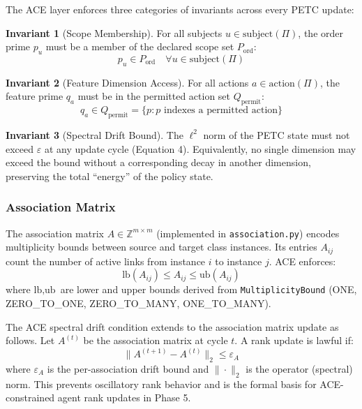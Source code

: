 \documentclass[12pt,letterpaper]{article}
\theoremstyle{definition}
\newtheorem{invariant}{Invariant}[section]
\theoremstyle{remark}
\begin{document}
The ACE layer enforces three categories of invariants across every PETC update:

\begin{invariant}[Scope Membership]
For all subjects \(u \in \text{subject}(\Pi)\), the order prime \(p_u\) must be a
member of the declared scope set \(P_{\text{ord}}\):
\[
  p_u \in P_{\text{ord}} \quad \forall u \in \text{subject}(\Pi) \tag{6}
\]
\end{invariant}

\begin{invariant}[Feature Dimension Access]
For all actions \(a \in \text{action}(\Pi)\), the feature prime \(q_a\) must be in the
permitted action set \(Q_{\text{permit}}\):
\[
  q_a \in Q_{\text{permit}} = \{p : p \text{ indexes a permitted action}\} \tag{7}
\]
\end{invariant}

\begin{invariant}[Spectral Drift Bound]
The \(\ell^2\) norm of the PETC state must not exceed \(\varepsilon\) at any update
cycle (Equation 4). Equivalently, no single dimension may exceed the bound without
a corresponding decay in another dimension, preserving the total ``energy'' of the
policy state.
\end{invariant}

\subsubsection{Association Matrix}

The association matrix \(A \in \mathbb{Z}^{m \times m}\) (implemented in
\texttt{association.py}) encodes multiplicity bounds between source and target class
instances. Its entries \(A_{ij}\) count the number of active links from instance \(i\)
to instance \(j\). ACE enforces:
\[
  \text{lb}(A_{ij}) \leq A_{ij} \leq \text{ub}(A_{ij}) \tag{8}
\]
where \(\text{lb}, \text{ub}\) are lower and upper bounds derived from
\texttt{MultiplicityBound} (ONE, ZERO\_TO\_ONE, ZERO\_TO\_MANY, ONE\_TO\_MANY).

The ACE spectral drift condition extends to the association matrix update as follows.
Let \(A^{(t)}\) be the association matrix at cycle \(t\). A rank update is lawful if:
\[
  \|A^{(t+1)} - A^{(t)}\|_2 \leq \varepsilon_A \tag{9}
\]
where \(\varepsilon_A\) is the per-association drift bound and \(\|\cdot\|_2\) is the
operator (spectral) norm. This prevents oscillatory rank behavior and is the formal
basis for ACE-constrained agent rank updates in Phase 5.
\end{document}
